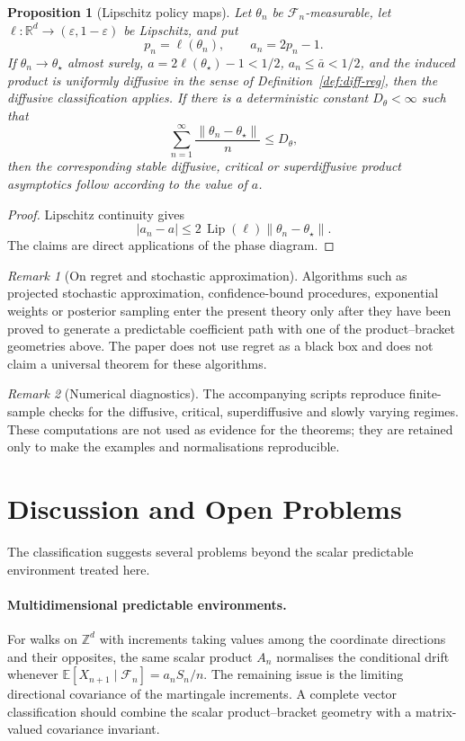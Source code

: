 \documentclass[11pt]{article}
\newtheorem{proposition}{Proposition}
\theoremstyle{definition}
\theoremstyle{remark}
\newtheorem{remark}{Remark}
\newcommand{\F}{\mathcal{F}}
\newcommand{\E}{\mathbb{E}}
\newcommand{\R}{\mathbb{R}}
\newcommand{\1}{\mathbf{1}}
\begin{document}
\begin{proposition}[Lipschitz policy maps]\label{prop:lipschitz}
Let \(\theta_n\) be \(\F_n\)-measurable, let
\(\ell:\R^d\to(\varepsilon,1-\varepsilon)\) be Lipschitz, and put
\[
  p_n=\ell(\theta_n),\qquad a_n=2p_n-1.
\]
If \(\theta_n\to\theta_\star\) almost surely, \(a=2\ell(\theta_\star)-1<1/2\),
\(a_n\le\bar a<1/2\), and the induced product is uniformly diffusive in the
sense of Definition~\ref{def:diff-reg}, then the diffusive classification
applies. If there is a deterministic constant \(D_\theta<\infty\) such that
\[
  \sum_{n=1}^\infty \frac{\|\theta_n-\theta_\star\|}{n}\le D_\theta,
\]
then the corresponding stable diffusive, critical or superdiffusive product
asymptotics follow according to the value of \(a\).
\end{proposition}

\begin{proof}
Lipschitz continuity gives
\[
  |a_n-a|\le 2\,\operatorname{Lip}(\ell)\|\theta_n-\theta_\star\|.
\]
The claims are direct applications of the phase diagram.
\end{proof}

\begin{remark}[On regret and stochastic approximation]
Algorithms such as projected stochastic approximation, confidence-bound
procedures, exponential weights or posterior sampling enter the present theory
only after they have been proved to generate a predictable coefficient path with
one of the product--bracket geometries above. The paper does not use regret as a
black box and does not claim a universal theorem for these algorithms.
\end{remark}

\begin{remark}[Numerical diagnostics]
The accompanying scripts reproduce finite-sample checks for the diffusive,
critical, superdiffusive and slowly varying regimes. These computations are not
used as evidence for the theorems; they are retained only to make the examples
and normalisations reproducible.
\end{remark}

\section{Discussion and Open Problems}\label{sec:open}

The classification suggests several problems beyond the scalar predictable
environment treated here.

\paragraph{Multidimensional predictable environments.}
For walks on \(\mathbb Z^d\) with increments taking values among the coordinate
directions and their opposites, the same scalar product \(A_n\) normalises the
conditional drift whenever
\(\E[X_{n+1}\mid\F_n]=a_nS_n/n\). The remaining issue is the limiting
directional covariance of the martingale increments. A complete vector
classification should combine the scalar product--bracket geometry with a
matrix-valued covariance invariant.
\end{document}
